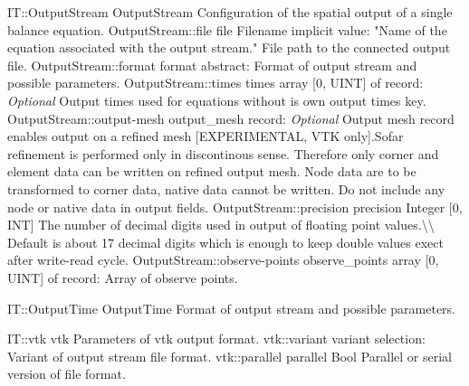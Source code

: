 \begin{RecordType}
	{IT::OutputStream}
	{OutputStream}
	{}%
	{}%
	{{{Configuration of the spatial output of a single balance equation.}%
}}
		\RecKey
			{OutputStream::file}
			{file}
			{{Filename}}{}
			{implicit value: "{Name of the equation associated with the output stream.}"}
			{{{File path to the connected output file.}%
}}
		\RecKey
			{OutputStream::format}
			{format}
			{{abstract: }}{}
			{ \ValueDefault{{\{}{\}}}}
			{{{Format of output stream and possible parameters.}%
}}
		\RecKey
			{OutputStream::times}
			{times}
			{{array [0, UINT] of }{record: }}{}
			{ \it{Optional}}
			{{{Output times used for equations without is own output times key.}%
}}
		\RecKey
			{OutputStream::output-mesh}
			{output{\_}mesh}
			{{record: }}{}
			{ \it{Optional}}
			{{{Output mesh record enables output on a refined mesh [EXPERIMENTAL, VTK only].Sofar refinement is performed only in discontinous sense.
Therefore only corner and element data can be written on refined output mesh.
Node data are to be transformed to corner data, native data cannot be written.
Do not include any node or native data in output fields.}%
}}
		\RecKey
			{OutputStream::precision}
			{precision}
			{{Integer [0, INT]}}{}
			{ }
			{{{The number of decimal digits used in output of floating point values.{\textbackslash}{\textbackslash} Default is about 17 decimal digits which is enough to keep double values exect after write-read cycle.}%
}}
		\RecKey
			{OutputStream::observe-points}
			{observe{\_}points}
			{{array [0, UINT] of }{record: }}{}
			{ \ValueDefault{[]}}
			{{{Array of observe points.}%
}}
\end{RecordType}
\begin{AbstractType}
	{IT::OutputTime}
	{OutputTime}
	{}
	{{{Format of output stream and possible parameters.}%
}}
\end{AbstractType}
\begin{RecordType}
	{IT::vtk}
	{vtk}
	{}%
	{}%
	{{{Parameters of vtk output format.}%
}}
		\RecKey
			{vtk::variant}
			{variant}
			{{selection: }}{}
			{ }
			{{{Variant of output stream file format.}%
}}
		\RecKey
			{vtk::parallel}
			{parallel}
			{{Bool}}{}
			{ }
			{{{Parallel or serial version of file format.}%
}}
\end{RecordType}

